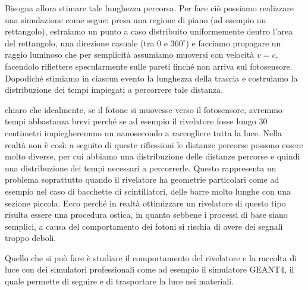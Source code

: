 Bisogna allora stimare tale lunghezza percorsa. Per fare ciò possiamo realizzare una simulazione come segue: presa una regione di piano (ad esempio un rettangolo), estraiamo un punto a caso distribuito uniformemente dentro l'area del rettangolo, una direzione casuale (tra $0$ e $360^{\circ}$) e facciamo propagare un raggio luminoso che per semplicità assumiamo muoversi con velocità $v=c$, facendolo riflettere specularmente sulle pareti finché non arriva sul fotosensore. Dopodiché stimiamo in ciascun evento la lunghezza della traccia e costruiamo la distribuzione dei tempi impiegati a percorrere tale distanza. 

\begin{figure}[H]
   \centering
\end{figure}

\E chiaro che idealmente, se il fotone si muovesse verso il fotosensore, avremmo tempi abbastanza brevi perché se ad esempio il rivelatore fosse lungo 30 centimetri impiegheremmo un nanosecondo a raccogliere tutta la luce. Nella realtà non è così: a seguito di queste riflessioni le distanze percorse possono essere molto diverse, per cui abbiamo una distribuzione delle distanze percorse e quindi una distribuzione dei tempi necessari a percorrerle. Questo rappresenta un problema soprattutto quando il rivelatore ha geometrie particolari come ad esempio nel caso di bacchette di scintillatori, delle barre molto lunghe con una sezione piccola. Ecco perché in realtà ottimizzare un rivelatore di questo tipo risulta essere una procedura ostica, in quanto sebbene i processi di base siano semplici, a causa del comportamento dei fotoni si rischia di avere dei segnali troppo deboli.


Quello che si può fare è studiare il comportamento del rivelatore e la raccolta di luce con dei simulatori professionali come ad esempio il simulatore GEANT4, il quale permette di seguire e di trasportare la luce nei materiali. 


